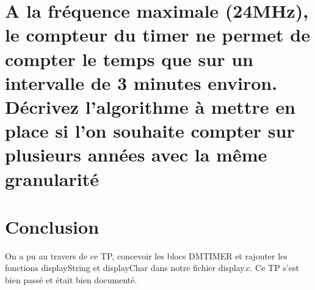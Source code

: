 \section{A la fréquence maximale (24MHz), le compteur du timer ne permet de compter le temps que sur un intervalle de 3 minutes environ. Décrivez l'algorithme à mettre en place si l'on souhaite compter sur plusieurs années avec la même granularité}

\section{Conclusion}

On a pu au travers de ce TP, concevoir les blocs DMTIMER et rajouter les fonctions displayString et displayChar dans notre fichier display.c. Ce TP s'est bien passé et était bien documenté.


